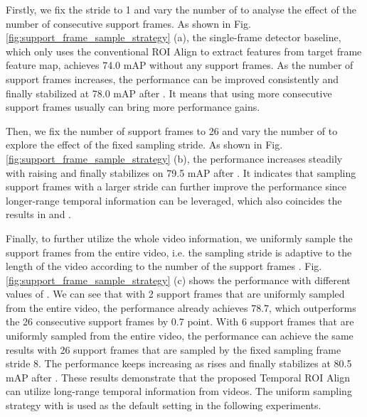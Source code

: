 \documentclass[letterpaper]{article} \usepackage{aaai21}  \usepackage{times}  \usepackage{helvet} \usepackage{courier}  \usepackage[hyphens]{url}  \usepackage{graphicx} \usepackage{hyperref}
\begin{document}
Firstly, we fix the stride  to 1 and vary the number of  to analyse the effect of the number of consecutive support frames. As shown in Fig. \ref{fig:support_frame_sample_strategy} (a), the single-frame detector baseline, which only uses the conventional ROI Align to extract features from target frame feature map, achieves 74.0 mAP without any support frames. As the number of support frames increases, the performance can be improved consistently and finally stabilized at 78.0 mAP after . It means that using more consecutive support frames usually can bring more performance gains.


Then, we fix the number of support frames  to 26 and vary the number of  to explore the effect of the fixed sampling stride. As shown in Fig. \ref{fig:support_frame_sample_strategy} (b), the performance increases steadily with  raising and finally stabilizes on 79.5 mAP after .
It indicates that sampling support frames with a larger stride can further improve the performance since longer-range temporal information can be leveraged, which also coincides the results in \cite{shvets2019leveraging} and \cite{wu2019sequence}.

Finally, to further utilize the whole video information, we uniformly sample the support frames from the entire video, i.e. the sampling stride  is adaptive to the length of the video according to the number of the support frames . Fig. \ref{fig:support_frame_sample_strategy} (c) shows the performance with different values of .
We can see that with 2 support frames that are uniformly sampled from the entire video, the performance already achieves 78.7, which outperforms the 26 consecutive support frames by 0.7 point. With 6 support frames that are uniformly sampled from the entire video, the performance can achieve the same results with 26 support frames that are sampled by the fixed sampling frame stride 8. The performance keeps increasing as  rises and finally stabilizes at 80.5 mAP after .
These results demonstrate that the proposed Temporal ROI Align can utilize long-range temporal information from videos. The uniform sampling strategy with  is used as the default setting in the following experiments.
\end{document}
